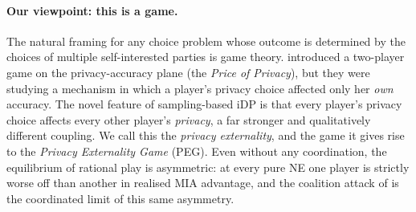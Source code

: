 \paragraph{Our viewpoint: this is a game.}
The natural framing for any choice problem whose outcome is determined by
the choices of multiple self-interested parties is game theory.
\citet{pejo2019together} introduced a two-player game on the privacy-accuracy
plane (the \emph{Price of Privacy}), but they were studying a mechanism in
which a player's privacy choice affected only her \emph{own} accuracy. The
novel feature of sampling-based iDP is that every player's privacy choice
affects every other player's \emph{privacy}, a far stronger and qualitatively
different coupling. We call this the \emph{privacy externality}, and the
game it gives rise to the \emph{Privacy Externality Game} (PEG).
Even without any coordination, the equilibrium of rational play is
asymmetric: at every pure NE one player is strictly worse off than
another in realised MIA advantage, and the coalition attack of
\citet{kaiser2026your} is the coordinated limit of this same
asymmetry.

